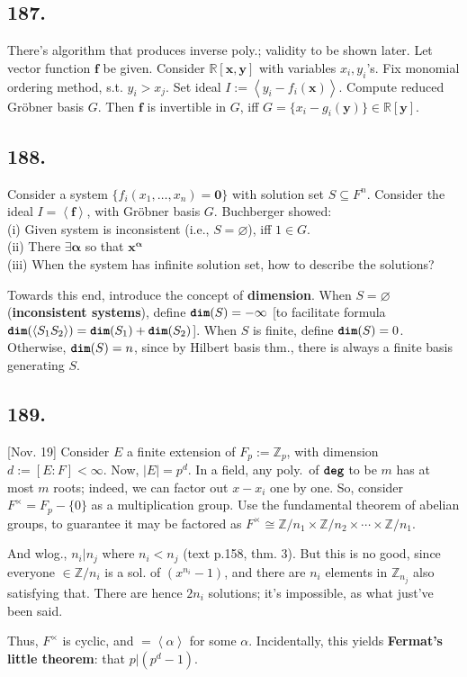 \documentclass[12pt]{article}
\newcommand\aG\alpha \newcommand\bG\beta  \newcommand\gG\gamma \newcommand\dG\delta \newcommand\eG\varepsilon \newcommand\zG\zeta \newcommand\tG\vartheta \newcommand\kG\kappa \newcommand\lG\lambda \newcommand\sG\sigma \newcommand\fG\varphi \newcommand\oG\omega
\newcommand\oo\infty%
\newcommand\X\times%
\newcommand\V\mathbf%
\newcommand\Ex\exists%
\newcommand{\Ab}[1]{ \left\langle #1 \right\rangle } %
\newcommand{\BF}[1]{ \mathbb{#1} }%
\newcommand{\Ss}[1]{\textsf{\bfseries{#1}}}%
\newcommand{\Tw}[1]{\texttt{\bfseries{#1}}}%
\begin{document}
\subsection*{187.} There's algorithm that produces inverse poly.; validity to be shown later. 
Let vector function \(\V{f}\) be given. 
Consider \(\BF{R}[\V{x},\V{y}]\) with variables \(x_i, y_i\)'s. 
Fix monomial ordering method, s.t. \(y_i >x_j\). 
Set ideal \(I := \Ab{y_i -f_i(\V{x})}\). 
Compute reduced Gr\"obner basis \(G\). 
Then \(\V{f}\) is invertible in \(G\), iff \(G= \{x_i - g_i(\V{y})\} \in \BF{R}[\V{y}]\). 

\subsection*{188.} Consider a system \(\{f_i(x_1,\dotsc,x_n) =\V{0}\}\) with solution set \(S \subseteq F^n\). 
Consider the ideal \(I =\Ab{\V{f}}\), with Gr\"obner basis \(G\). 
Buchberger showed: \\
\indent (i) Given system is inconsistent (i.e., \(S =\varnothing\)), iff \(1 \in G\). \\
\indent (ii) There \(\Ex \pmb{\aG}\) so that \(\V{x}^{\pmb{\aG}}\) \\
\indent (iii) When the system has infinite solution set, how to describe the solutions? \par
Towards this end, introduce the concept of \Ss{dimension}. 
When \(S =\varnothing\) (\Ss{inconsistent systems}), define \(\Tw{dim}(S) =-\oo\) [to facilitate formula \(\Tw{dim}(\Ab{S_1 S_2}) =\Tw{dim}(S_1) +\Tw{dim}(S_2)\)]. 
When \(S\) is finite, define \(\Tw{dim}(S) =0\). 
Otherwise, \(\Tw{dim}(S) =n\), since by Hilbert basis thm., there is always a finite basis generating \(S\).

\subsection*{189.} [Nov. 19] Consider \(E\) a finite extension of \(F_p := \BF{Z}_p\), with dimension \(d := [E:F] <\oo\). 
Now, \(|E| =p^d\). 
In a field, any poly.\ of \(\Tw{deg}\) to be \(m\) has at most \(m\) roots; 
indeed, we can factor out \(x-x_i\) one by one. 
So, consider \(F^\X = F_p -\{0\}\) as a multiplication group. 
Use the fundamental theorem of abelian groups, to guarantee it may be factored as \(F^\X \cong \BF{Z}/n_1 \X \BF{Z}/n_2 \X\dotsb\X \BF{Z}/n_1\). \par
And wlog., \(n_i \Big| n_j\) where \(n_i <n_j\) (text p.158, thm. 3). 
But this is no good, since everyone \(\in \BF{Z}/n_i\) is a sol. of \((x^{n_i}-1)\), and there are \(n_i\) elements in \(\BF{Z}_{n_j}\) also satisfying that. 
There are hence \(2n_i\) solutions; 
it's impossible, as what just've been said. \par
Thus, \(F^\X\) is cyclic, and \(=\Ab{\aG}\) for some \(\aG\). 
Incidentally, this yields \Ss{Fermat's little theorem}: that \(p \Big| (p^d -1)\). 
\end{document}
